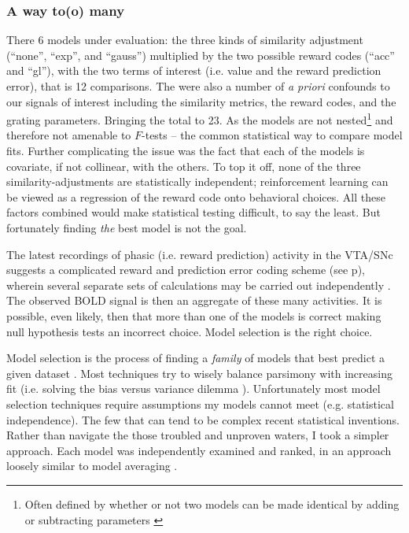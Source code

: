 \documentclass[doc,12pt]{apa}        %
\begin{document}
\subsubsection{A way to(o) many}
\label{subsub:tomany}
There 6 models under evaluation: the three kinds of similarity adjustment (``none'', ``exp'', and ``gauss'') multiplied by the two possible reward codes (``acc'' and ``gl''), with the two terms of interest (i.e. value and the reward prediction error), that is 12 comparisons.  The were also a number of \emph{a priori} confounds to our signals of interest including the similarity metrics, the reward codes, and the grating parameters.  Bringing the total to 23.  As the models are not nested\footnote{
    Often defined by whether or not two models can be made identical by adding or subtracting parameters \cite{Forster:2000p9623}} and therefore not amenable to $F$-tests -- the common statistical way to compare model fits.  Further complicating the issue was the fact that each of the models is covariate, if not collinear, with the others.  To top it off, none of the three similarity-adjustments are statistically independent; reinforcement learning can be viewed as a regression of the reward code onto behavioral choices.  All these factors combined would make statistical testing difficult, to say the least.  But fortunately finding \emph{the} best model is not the goal.  

The latest recordings of phasic (i.e. reward prediction) activity in the VTA/SNc suggests a complicated reward and prediction error coding scheme (see p\pageref{subsub:expectations}), wherein several separate sets of calculations may be carried out independently \cite{Kim:2006p1063, Matsumoto:2009p7219, Smith:2011p8133}.  The observed BOLD signal is then an aggregate of these many activities. It is possible, even likely, then that more than one of the models is correct making null hypothesis tests an incorrect choice.  Model selection is the right choice.

Model selection is the process of finding a \emph{family} of models that best predict a given dataset \cite{Rao:2001p9457}.  Most techniques try to wisely balance parsimony with increasing fit (i.e. solving the bias versus variance dilemma \cite{Geman:1p9469}).  Unfortunately most model selection techniques require assumptions my models cannot meet (e.g. statistical independence).  The few that can tend to be complex recent statistical inventions.  Rather than navigate the those troubled and unproven waters, I took a simpler approach. Each model was independently examined and ranked, in an approach loosely similar to model averaging \cite{Forster:2000p9623}.
\end{document}
